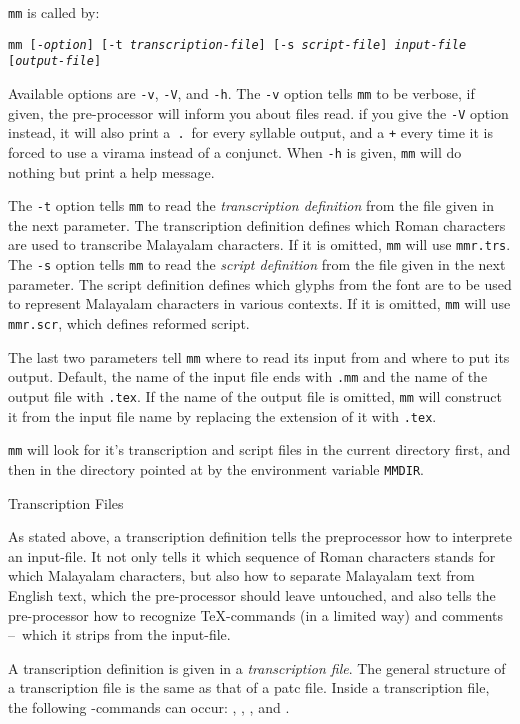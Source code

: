 {\tt mm} is called by:

\medskip
{\tt mm [-{\it option}] [-t {\it transcription-file}] [-s {\it script-file}] {\it input-file} [{\it output-file}]}
\medskip

Available options are {\tt-v}, {\tt-V}, and {\tt-h}.
The {\tt -v} option tells {\tt mm} to be verbose, if given,
the pre-processor will inform you about files read.
if you give the {\tt-V} option instead, it will also print
a~{\tt.}~for every syllable output, and a {\tt+} every time it is forced
to use a virama instead of a conjunct. When {\tt-h} is given, {\tt mm}
will do nothing but print a help message.

The {\tt-t} option tells {\tt mm} to read the {\it transcription definition} from
the file given in the next parameter. The transcription definition defines which
Roman characters are used to transcribe Malayalam characters. If it is omitted,
{\tt mm} will use {\tt mmr.trs}.
The {\tt-s} option tells {\tt mm} to read the {\it script definition} from the
file given in the next parameter. The script definition defines which glyphs from the
font are to be used to represent Malayalam characters in various
contexts. If it is omitted, {\tt mm} will use {\tt mmr.scr}, which
defines reformed script.

The last two parameters tell {\tt mm} where to read its input from and
where to put its output. Default, the name of the input file ends with
{\tt.mm} and the name of the output file with {\tt.tex}.
If the name of the output file is omitted, {\tt mm}
will construct it from the input file name by replacing the extension
of it with {\tt.tex}.

{\tt mm} will look for it's transcription and script files in the
current directory first, and then in the directory pointed at by the
environment variable {\tt MMDIR}.

\beginsection Transcription Files

As stated above, a transcription definition tells the preprocessor
how to interprete an input-file. It not only tells it which sequence
of Roman characters stands for which Malayalam characters, but also how to
separate Malayalam text from English text, which the pre-processor
should leave untouched, and also tells the pre-processor how to
recognize \TeX-commands (in a limited way) and comments --~which it
strips from the input-file.

A transcription definition is given in a {\it transcription file}.
The general structure of a transcription file is the same as that of a patc
file. Inside a transcription file, the following {\tt\@}-commands can
occur: {\tt\@atbegin}, {\tt\@atend}, {\tt\@table}, and {\tt\@end}.


